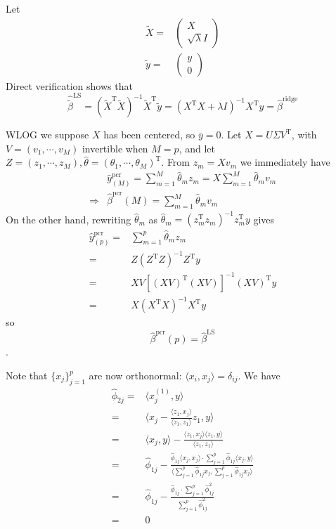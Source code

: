 \begin{sol}
Let
\begin{align*}
\tilde{X}=&\begin{pmatrix}
X\\
\sqrt{\lambda}I
\end{pmatrix}\\
\tilde{y}=&\begin{pmatrix}
y\\
0
\end{pmatrix}
\end{align*}
Direct verification shows that
\[
\hat{\tilde{\beta}}^{\mathrm{LS}}=\left(\tilde{X}^\mathrm{T}\tilde{X}\right)^{-1}\tilde{X}^\mathrm{T}\tilde{y}=\left(X^\mathrm{T}X+\lambda I\right)^{-1}X^\mathrm{T}y=\hat{\beta}^{\mathrm{ridge}}
\]
\end{sol}

\begin{sol}
WLOG we suppose $X$ has been centered, so $\bar{y}=0$. Let $X=U\Sigma V^\mathrm{T}$, with $V=(v_1,\cdots,v_M)$ invertible when $M=p$, and let $Z=(z_1,\cdots,z_M), \hat{\theta}=(\theta_1,\cdots,\theta_M)^\mathrm{T}$. From $z_m=Xv_m$ we immediately have
\begin{align*}
&\hat{y}_{(M)}^\mathrm{pcr}=\sum_{m=1}^{M}\hat{\theta}_mz_m=X\sum_{m=1}^{M}\hat{\theta}_mv_m\\
\Longrightarrow & \hat{\beta}^\mathrm{pcr}(M)=\sum_{m=1}^{M}\hat{\theta}_mv_m
\end{align*}
On the other hand, rewriting $\hat{\theta}_m$ as $\hat{\theta}_m=(z_m^\mathrm{T}z_m)^{-1}z_m^\mathrm{T}y$ gives 
\begin{align*}
\hat{y}_{(p)}^\mathrm{pcr}=&\sum_{m=1}^{p}\hat{\theta}_mz_m\\
=& Z(Z^\mathrm{T}Z)^{-1}Z^\mathrm{T}y\\
=& XV\left[(XV)^{\mathrm{T}}(XV)\right]^{-1}(XV)^\mathrm{T}y\\
=& X(X^\mathrm{T}X)^{-1}X^\mathrm{T}y
\end{align*}
so
\[
\hat{\beta}^\mathrm{pcr}(p)=\hat{\beta}^\mathrm{LS}
\].
\end{sol}

\begin{sol}
Note that $\{x_j\}_{j=1}^p$ are now orthonormal: $\langle x_i, x_j\rangle=\delta_{ij}$. We have
\begin{align*}
\hat{\phi}_{2j} =& \langle x_j^{(1)}, y\rangle\\
=& \langle x_j-\frac{\langle z_1, x_j \rangle}{\langle z_1, z_1 \rangle} z_1,y \rangle\\
=& \langle x_j,y\rangle - \frac{\langle z_1, x_j \rangle\langle z_1, y \rangle}{\langle z_1, z_1 \rangle}\\
=& \hat{\phi}_{1j}-\frac{\hat{\phi}_{1j}\langle x_j,x_j \rangle\cdot\sum_{j=1}^p\hat{\phi}_{1j}\langle x_j,y\rangle}{\langle \sum_{j=1}^p\hat{\phi}_{1j}x_j,\sum_{j=1}^p\hat{\phi}_{1j}x_j\rangle}\\
=& \hat{\phi}_{1j}-\frac{\hat{\phi}_{1j}\cdot\sum_{j=1}^p\hat{\phi}_{1j}^2}{ \sum_{j=1}^p\hat{\phi}_{1j}^2}\\
=& 0
\end{align*}
\end{sol}
